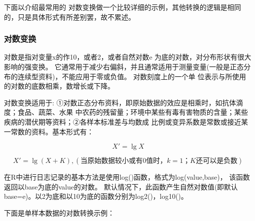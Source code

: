 \documentclass[
]{article}
\begin{document}
下面以介绍最常用的 对数变换做一个比较详细的示例，其他转换的逻辑是相同的，只是具体形式有所差别罢，故不累述。

\hypertarget{ux5bf9ux6570ux53d8ux6362}{%
\subsubsection{对数变换}\label{ux5bf9ux6570ux53d8ux6362}}

对数是指对变量x的作10，或者2，或者自然对数e 为底的对数，对分布形状有很大影响的强变换。
它通常用于减少右偏斜，并且通常适用于测量变量(一般是正态分布的连续型资料)，不能应用于零或负值。 对数刻度上的一个单
位表示与所使用的对数的底数相乘，数增长或下降。

对数变换适用于: ①对数正态分布资料，即原始数据的效应是相乘时，如抗体滴度；食品、蔬菜、水果
中农药的残留量；环境中某些有毒有害物质的含量；某些疾病的潜伏期等资料；②各样本标准差与均数成
比例或变异系数是常数或接近某一常数的资料。基本形式有：

\[ X'= \lg X \]

\[X'= \lg(X+K) , (当原始数据较小或有0值时，k=1；K还可以是负数)\]

在R中进行日志记录的基本方法是使用log()函数，格式为log(value,base)，
该函数返回以base为底的value的对数。 默认情况下，此函数产生自然对数值(即默认base=e)。以2为底和以10为底的函数分别为log2()，log10()。

下面是单样本数据的对数转换示例：
\end{document}
